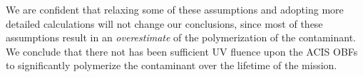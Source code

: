 \documentclass[11pt]{article}
\begin{document}
We are confident that relaxing some of these assumptions and adopting more detailed calculations will not change
our conclusions, since most of these assumptions result in an {\it overestimate} of the polymerization of the
contaminant. We conclude that there not has been sufficient UV fluence upon the ACIS OBFs to significantly
polymerize the contaminant over the lifetime of the mission.
\end{document}
